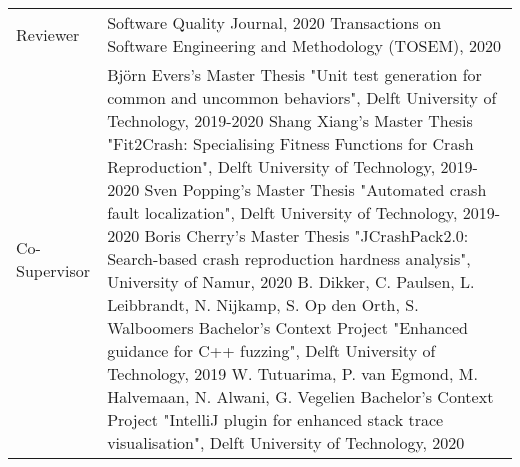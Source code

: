 \begin{longtable}{p{} p{}}
    Reviewer & Software Quality Journal, 2020 \newline \newline
    Transactions on Software Engineering and Methodology (TOSEM), 2020 \\
    
    Co-Supervisor & Björn Evers's Master Thesis "Unit test generation for common and uncommon behaviors", Delft University of Technology, 2019-2020 \newline\newline
    Shang Xiang's Master Thesis "Fit2Crash: Specialising Fitness Functions for Crash Reproduction", Delft University of Technology, 2019-2020 \newline\newline
    Sven Popping's Master Thesis "Automated crash fault localization", Delft University of Technology, 2019-2020 \newline\newline
    Boris Cherry's Master Thesis "JCrashPack2.0: Search-based crash reproduction hardness analysis", University of Namur, 2020 \newline \newline
    B. Dikker, C. Paulsen, L. Leibbrandt, N. Nijkamp, S. Op den Orth, S. Walboomers Bachelor's Context Project "Enhanced guidance for C++ fuzzing", Delft University of Technology, 2019 \newline \newline
    W. Tutuarima, P. van Egmond, M. Halvemaan, N. Alwani, G. Vegelien Bachelor's Context Project "IntelliJ plugin for enhanced stack trace visualisation", Delft University of Technology, 2020
\end{longtable}

